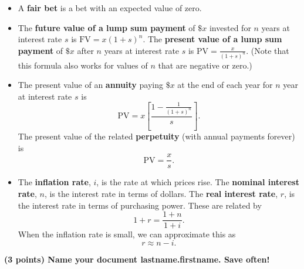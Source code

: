 \documentclass[twoside]{article}
\begin{document}
\begin{EXAM}
\begin{itemize}
\item A \textbf{fair bet} is a bet with an expected value of zero.

\item The \textbf{future value of a lump sum payment} of $\$x$ invested for $n$ years at interest rate $s$ is
$\displaystyle \mbox{FV} = x(1+s)^{n}$. The \textbf{present value of a lump sum payment} of $\$x$ after $n$ years at
interest rate $s$ is $\displaystyle \mbox{PV} = \frac{x}{(1+s)^{n}}.$ (Note that this formula also works for values of
$n$ that are negative or zero.)

\item The present value of an \textbf{annuity} paying $\$x$ at the end of each year for $n$ year at interest rate $s$ is
\[
\mbox{PV}=x\left[ \frac{1 - \displaystyle\frac{1}{(1+s)^n}}{s}\right].
\]
The present value of the related \textbf{perpetuity} (with annual payments forever) is
\[
\mbox{PV}=\frac{x}{s}.
\]

\item The \textbf{inflation rate}, $i$, is the rate at which prices rise. The \textbf{nominal interest rate}, $n$, is the
interest rate in terms of dollars. The \textbf{real interest rate}, $r$, is the interest rate in terms of purchasing
power. These are related by
\[
1+r=\frac{1+n}{1+i}.
\]
When the inflation rate is small, we can approximate this as
\[
r \approx n-i.
\]

\end{itemize}

\clearpage
\end{EXAM}

\begin{EXAM}

\vspace*{-2cm}


{\bf (3 points) Name your document lastname.firstname. Save often!}

\medskip

\bigskip

\end{EXAM}
\end{document}
